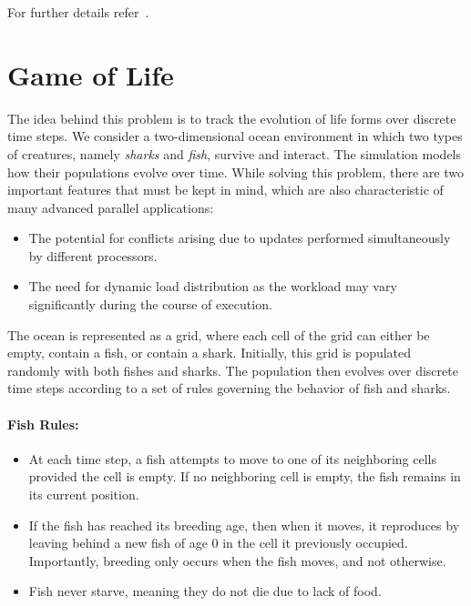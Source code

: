 \documentclass[12pt]{book}
\begin{document}
For further details refer~\cite{aluru2003parallel}.





\section{Game of Life}
The idea behind this problem is to track the evolution of life forms over discrete time steps. We consider a two-dimensional ocean environment in which two types of creatures, namely \emph{sharks} and \emph{fish}, survive and interact. The simulation models how their populations evolve over time. While solving this problem, there are two important features that must be kept in mind, which are also characteristic of many advanced parallel applications:
\begin{itemize}
    \item The potential for conflicts arising due to updates performed simultaneously by different processors.
    \item The need for dynamic load distribution as the workload may vary significantly during the course of execution.
\end{itemize}

The ocean is represented as a grid, where each cell of the grid can either be empty, contain a fish, or contain a shark. Initially, this grid is populated randomly with both fishes and sharks. The population then evolves over discrete time steps according to a set of rules governing the behavior of fish and sharks.

\paragraph{Fish Rules:}
\begin{itemize}
    \item At each time step, a fish attempts to move to one of its neighboring cells provided the cell is empty. If no neighboring cell is empty, the fish remains in its current position.
    \item If the fish has reached its breeding age, then when it moves, it reproduces by leaving behind a new fish of age $0$ in the cell it previously occupied. Importantly, breeding only occurs when the fish moves, and not otherwise.
    \item Fish never starve, meaning they do not die due to lack of food.
\end{itemize}
\end{document}
